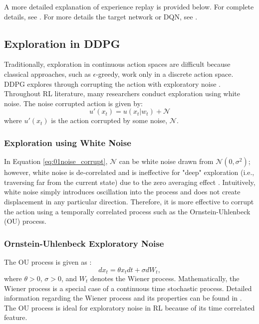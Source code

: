 A more detailed explanation of experience replay is provided below.  For complete details, see \cite{exp_replay, p_exp}. For more details the target network or DQN, see \cite{dqn1, dqn2}.  

\subsection{Exploration in DDPG}
Traditionally, exploration in continuous action spaces are difficult because classical approaches, such as $\epsilon$-greedy, work only in a discrete action space.  DDPG explores through corrupting the action with exploratory noise \cite{ddpg}.  Throughout RL literature, many researchers conduct exploration using white noise. The noise corrupted action is given by:
\begin{equation}
    u'(x_t) = u(x_t|w_t) + \mathcal{N}
    \label{eq:01noise_corrupt}
\end{equation}
where $u'(x_t)$ is the action corrupted by some noise, $\mathcal{N}$.

\subsubsection{Exploration using White Noise}
In Equation \ref{eq:01noise_corrupt}, $\mathcal{N}$ can be white noise drawn from $\mathcal{N}(0, \sigma^2)$; however, white noise is de-correlated and is ineffective for "deep" exploration (i.e., traversing far from the current state) due to the zero averaging effect \cite{white_noise}. Intuitively, white noise simply introduces oscillation into the process and does not create displacement in any particular direction. Therefore, it is more effective to corrupt the action using a temporally correlated process such as the Ornstein-Uhlenbeck (OU) process.

\subsubsection{Ornstein-Uhlenbeck Exploratory Noise}

The OU process is given as \cite{ornstein}:
\begin{equation}
    dx_t = \theta x_t dt + \sigma dW_t,
    \label{eq:01OU}
\end{equation}
where $\theta > 0$, $\sigma > 0$, and $W_t$ denotes the Wiener process. Mathematically, the Wiener process is a special case of a continuous time stochastic process. Detailed information regarding the Wiener process and its properties can be found in \cite{wiener}. The OU process is ideal for exploratory noise in RL because of its time correlated feature.

